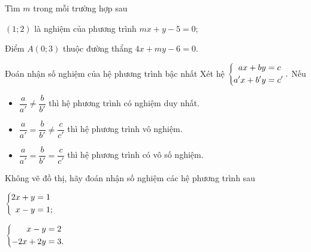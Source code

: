 \begin{vd}
	Tìm $m$ trong mỗi trường hợp sau
\begin{enumEX}{1}
	\item $(1;2)$ là nghiệm của phương trình $mx+y-5=0$;
	\item Điểm $A(0;3)$ thuộc đường thẩng $4x+my-6=0$. 
\end{enumEX}
\end{vd}		
\begin{dang}{Đoán nhận số nghiệm của hệ phương trình bậc nhất}
	Xét hệ $\left\{\begin{aligned}ax+by&=c\\a'x+b'y&=c'\end{aligned}\right..$ Nếu
	\begin{itemize}
		\item $\dfrac{a}{a'}\neq \dfrac{b}{b'}$ thì hệ phương trình có nghiệm duy nhất.
		\item $\dfrac{a}{a'} = \dfrac{b}{b'} \neq \dfrac{c}{c'}$ thì hệ phương trình vô nghiệm.
		\item $\dfrac{a}{a'} = \dfrac{b}{b'} = \dfrac{c}{c'}$ thì hệ phương trình có vô số nghiệm.
	\end{itemize}
\end{dang}
\begin{vd}
Không vẽ đồ thị, hãy đoán nhận số nghiệm các hệ phương trình sau
\begin{enumEX}{2}  
	\item $\left\{\begin{aligned}2x+y&=1\\x-y&=1;\end{aligned}\right.$
	\item $\left\{\begin{aligned}x-y&=2\\-2x+2y&=3.\end{aligned}\right.$
\end{enumEX}
\end{vd}	
